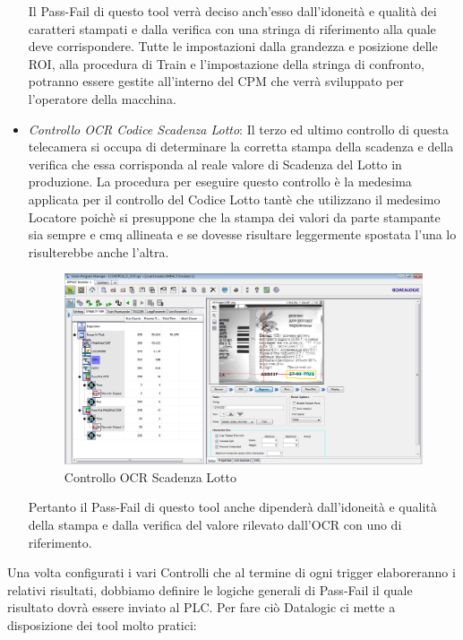 \documentclass[12pt, a4paper, oneside]{book}
\begin{document}
\begin{itemize}
Il Pass-Fail di questo tool verrà deciso anch'esso dall'idoneità e qualità dei caratteri stampati e dalla verifica con una stringa di riferimento alla quale deve corrispondere. Tutte le impostazioni dalla grandezza e posizione delle ROI, alla procedura di Train e l'impostazione della stringa di confronto, potranno essere gestite all'interno del CPM che verrà sviluppato per l'operatore della macchina. 
	
	
	\item \textit{Controllo OCR Codice Scadenza Lotto}: Il terzo ed ultimo controllo di questa telecamera si occupa di determinare la corretta stampa della scadenza e della verifica che essa corrisponda al reale valore di Scadenza del Lotto in produzione. La procedura per eseguire questo controllo è la medesima applicata per il controllo del Codice Lotto tantè che utilizzano il medesimo Locatore poichè si presuppone che la stampa dei valori da parte stampante sia sempre e cmq allineata e se dovesse risultare leggermente spostata l'una lo risulterebbe anche l'altra. 
	
	\begin{figure}[H]
		\centering
		\includegraphics[width=13cm]{Immagini/VIS11}
		\caption{Controllo OCR Scadenza Lotto}
		\label{vis11}
	\end{figure}
	
	Pertanto il Pass-Fail di questo tool anche dipenderà dall'idoneità e qualità della stampa e dalla verifica del valore rilevato dall'OCR con uno di riferimento.

\end{itemize}

Una volta configurati i vari Controlli che al termine di ogni trigger elaboreranno i relativi risultati, dobbiamo definire le logiche generali di Pass-Fail il quale risultato dovrà essere inviato al PLC.
Per fare ciò Datalogic ci mette a disposizione dei tool molto pratici:
\end{document}
